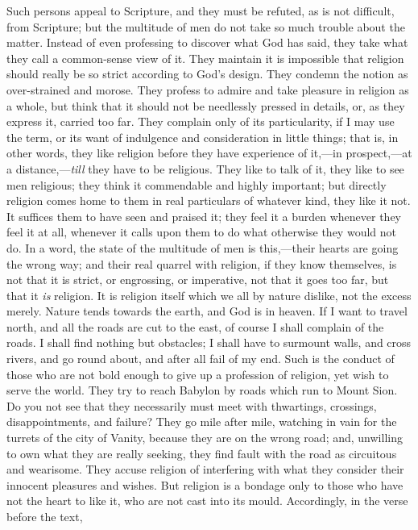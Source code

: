 Such persons appeal to Scripture, and they must be refuted, as is
not difficult, from Scripture; but the multitude of men do not take so
much trouble about the matter. Instead of even professing to discover
what God has said, they take what they call a common-sense view of it.
They maintain it is impossible that religion should really be so
strict according to God's design. They condemn the notion as
over-strained and morose. They profess to admire and take pleasure in
religion as a whole, but think that it should not be needlessly
pressed in details, or, as they express it, carried too far. They
complain only of its particularity, if I may use the term, or its want
of indulgence and consideration in little things; that is, in other
words, they like religion before they have experience of it,—in
prospect,—at a distance,—\emph{till} they have to be religious.
They like to talk of it, they like to see men religious; they think it
commendable and highly important; but directly religion comes home to
them in real particulars of whatever kind, they like it not. It
suffices them to have seen and praised it; they feel it a burden
whenever they feel it at all, whenever it calls upon them to do what
otherwise they would not do. In a word, the state of the multitude of
men is this,—their hearts are going the wrong way; and their real
quarrel with religion, if they know themselves, is not that it is
strict, or engrossing, or imperative, not that it goes too far, but
that it \emph{is} religion. It is religion itself which we all by
nature dislike, not the excess merely. Nature tends towards the earth,
and God is in heaven. If I want to travel north, and all the roads are
cut to the east, of course I shall complain of the roads. I shall find
nothing but obstacles; I shall have to surmount walls, and cross
rivers, and go round about, and after all fail of my end. Such is the
conduct of those who are not bold enough to give up a profession of
religion, yet wish to serve the world. They try to reach Babylon by
roads which run to Mount Sion. Do you not see that they necessarily
must meet with thwartings, crossings, disappointments, and failure?
They go mile after mile, watching in vain for the turrets of the city
of Vanity, because they are on the wrong road; and, unwilling to own
what they are really seeking, they find fault with the road as
circuitous and wearisome. They accuse religion of interfering with
what they consider their innocent pleasures and wishes. But religion
is a bondage only to those who have not the heart to like it, who are
not cast into its mould. Accordingly, in the verse before the text,
